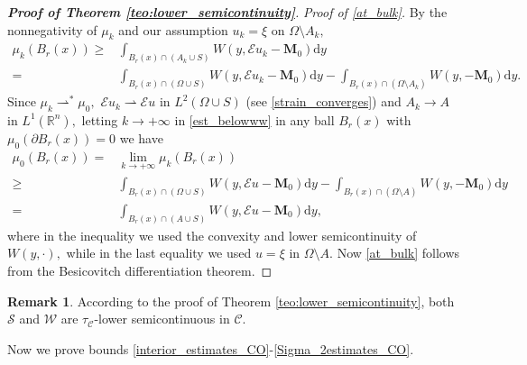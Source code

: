 \documentclass[reqno]{amsart}
\numberwithin{equation}{section}
\theoremstyle{plain}
\theoremstyle{definition}
\newtheorem{remark}[theorem]{Remark}
\newcommand{\R}{\mathbb{R}}
\newcommand{\bM}{\mathbf{M}}
\newcommand{\cS}{\mathcal{S}}
\newcommand{\cW}{\mathcal{W}}
\newcommand{\p}{\partial}
\newcommand{\wk}{\rightharpoonup}
\renewcommand{\d}{\mathrm{d}}
\newcommand{\str}[1]{\mathcal{E}#1}
\newcommand{\admissible}{\mathcal{C}}
\newcommand{\substrate}{S}
\begin{document}
\begin{proof}[\textbf{Proof of Theorem \ref{teo:lower_semicontinuity}}]
{\it Proof of \eqref{at_bulk}.} By the nonnegativity of $\mu_k$ and our assumption $u_k=\xi$ on $\Omega\setminus A_k,$
\begin{align}\label{est_belowww}
\mu_k(B_r(x))\ge & \int_{B_r(x)\cap (A_k\cup \substrate)} W(y,\str{u_k} - \bM_0)\d y\nonumber \\
= & \int_{B_r(x)\cap (\Omega\cup \substrate)} W(y,\str{u_k} - \bM_0)\d y - \int_{B_r(x)\cap (\Omega\setminus A_k)} W(y,-\bM_0)\d y.
\end{align}
%
Since $\mu_k\wk^*\mu_0,$ $\str{u_k}\wk \str{u}$ in $L^2(\Omega\cup\substrate)$ (see \eqref{strain_converges}) and $A_k\to A$ in $L^1(\R^n),$  letting $k\to+\infty$ in \eqref{est_belowww} in any ball $B_r(x)$ with $\mu_0(\p B_r(x))=0$  we have
%
\begin{align*}
\mu_0(B_r(x))= & \lim\limits_{k\to+\infty} \mu_k(B_r(x))\\
\ge & \int_{B_r(x)\cap (\Omega\cup \substrate)} W(y,\str{u} - \bM_0)\d y - \int_{B_r(x)\cap (\Omega\setminus A)} W(y,-\bM_0)\d y\\
=& \int_{B_r(x)\cap (A\cup \substrate)} W(y,\str{u} - \bM_0)\d y,
\end{align*}
where in the inequality we used the convexity and lower semicontinuity of $W(y,\cdot),$ while in the last equality we used $u=\xi$ in $\Omega\setminus A.$ Now \eqref{at_bulk} follows from the Besicovitch differentiation theorem.
%
\end{proof}


\begin{remark}
According to the proof of Theorem \ref{teo:lower_semicontinuity}, both $\cS$ and $\cW$ are $\tau_\admissible$-lower semicontinuous in $\admissible.$
\end{remark}

 
Now we prove bounds \eqref{interior_estimates_CO}-\eqref{Sigma_2estimates_CO}.
\end{document}
